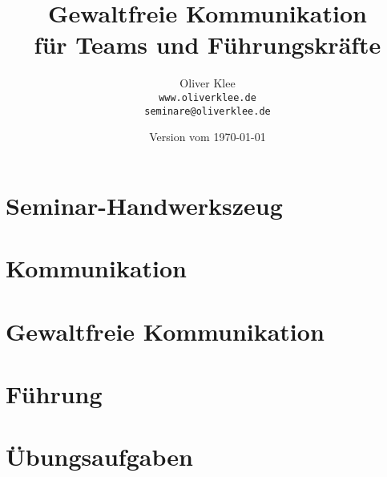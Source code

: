 \documentclass[a4paper,openany,twoside,titlepage,10pt,headsepline]{scrbook}
\title{Gewaltfreie Kommunikation\\für Teams und Führungskräfte}
\author{Oliver Klee\\\texttt{www.oliverklee.de}\\\texttt{seminare@oliverklee.de}}
\date{Version vom \today}
\begin{document}
\frontmatter

\maketitle

\tableofcontents


\mainmatter

\chapter{Seminar-Handwerkszeug}





\chapter{Kommunikation}






\chapter{Gewaltfreie Kommunikation}



















\chapter{Führung}







\chapter{Übungsaufgaben}




\backmatter





\printindex
\end{document}
